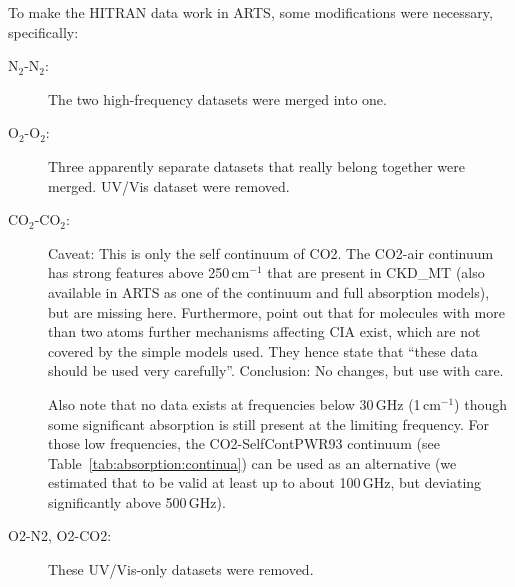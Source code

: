 To make the HITRAN data work in ARTS, some modifications were necessary,
specifically:

\begin{description}
\item[N$_2$-N$_2$:] The two high-frequency datasets were merged into one.
\item[O$_2$-O$_2$:] Three apparently separate datasets that really
  belong together were merged. UV/Vis dataset were removed.
\item[CO$_2$-CO$_2$:] Caveat: This is only the self continuum of
  CO2. The CO2-air continuum has strong features above 250\,cm$^{-1}$ that
  are present in CKD\_MT (also available in ARTS as one of the
  continuum and full absorption models), but are missing here.
  Furthermore, \citet{richard:12} point out that for molecules with more than two atoms
  further mechanisms affecting CIA exist, which are not covered by the simple
  models used. They hence state that ``these data should be used very
  carefully''. Conclusion: No changes, but use with care.

  Also note that no data exists at frequencies below 30\,GHz (1\,cm$^{-1}$)
  though some significant absorption is still present at the limiting frequency.
  For those low frequencies, the CO2-SelfContPWR93 continuum (see
  Table~\ref{tab:absorption:continua}) can be used as an alternative (we
  estimated that to be valid at least up to about 100\,GHz, but deviating
  significantly above 500\,GHz).
\item[O2-N2, O2-CO2:] These UV/Vis-only datasets were removed.


\end{description}
